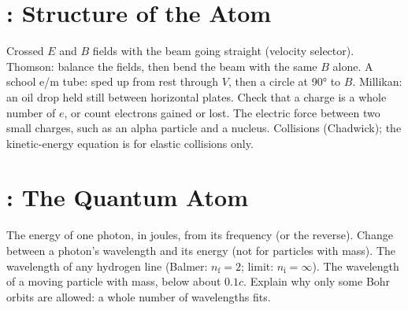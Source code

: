 \section*{: Structure of the Atom}
\begin{formulatable}
    {Crossed $E$ and $B$ fields with the beam going straight (velocity selector).}
    {Thomson: balance the fields, then bend the beam with the same $B$ alone.}
    {A school e/m tube: sped up from rest through $V$, then a circle at \ang{90} to $B$.}
    {Millikan: an oil drop held still between horizontal plates.}
    {Check that a charge is a whole number of $e$, or count electrons gained or lost.}
    {The electric force between two small charges, such as an alpha particle and a nucleus.}
    {Collisions (Chadwick); the kinetic-energy equation is for elastic collisions only.}
\end{formulatable}

\section*{: The Quantum Atom}
\begin{formulatable}
    {The energy of one photon, in joules, from its frequency (or the reverse).}
    {Change between a photon's wavelength and its energy (not for particles with mass).}
    {The wavelength of any hydrogen line (Balmer: $n_\mathrm{f} = 2$; limit:
     $n_\mathrm{i} = \infty$).}
    {The wavelength of a moving particle with mass, below about $0.1c$.}
    {Explain why only some Bohr orbits are allowed: a whole number of wavelengths fits.}
\end{formulatable}

